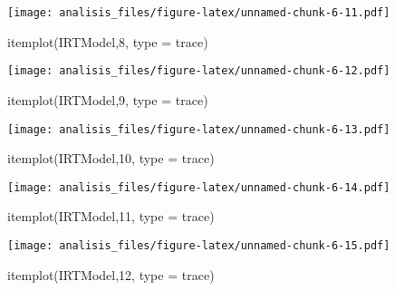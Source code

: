 \documentclass[
]{article}
\newenvironment{Shaded}{\begin{snugshade}}{\end{snugshade}}
\newcommand{\AttributeTok}[1]{\textcolor[rgb]{0.77,0.63,0.00}{#1}}
\newcommand{\DecValTok}[1]{\textcolor[rgb]{0.00,0.00,0.81}{#1}}
\newcommand{\FunctionTok}[1]{\textcolor[rgb]{0.00,0.00,0.00}{#1}}
\newcommand{\NormalTok}[1]{#1}
\newcommand{\StringTok}[1]{\textcolor[rgb]{0.31,0.60,0.02}{#1}}
\begin{document}
\texttt{[image: analisis\_files/figure-latex/unnamed-chunk-6-11.pdf]}

\begin{Shaded}
\begin{Highlighting}[]
\FunctionTok{itemplot}\NormalTok{(IRTModel,}\DecValTok{8}\NormalTok{, }\AttributeTok{type =} \StringTok{\textquotesingle{}trace\textquotesingle{}}\NormalTok{)}
\end{Highlighting}
\end{Shaded}

\texttt{[image: analisis\_files/figure-latex/unnamed-chunk-6-12.pdf]}

\begin{Shaded}
\begin{Highlighting}[]
\FunctionTok{itemplot}\NormalTok{(IRTModel,}\DecValTok{9}\NormalTok{, }\AttributeTok{type =} \StringTok{\textquotesingle{}trace\textquotesingle{}}\NormalTok{)}
\end{Highlighting}
\end{Shaded}

\texttt{[image: analisis\_files/figure-latex/unnamed-chunk-6-13.pdf]}

\begin{Shaded}
\begin{Highlighting}[]
\FunctionTok{itemplot}\NormalTok{(IRTModel,}\DecValTok{10}\NormalTok{, }\AttributeTok{type =} \StringTok{\textquotesingle{}trace\textquotesingle{}}\NormalTok{)}
\end{Highlighting}
\end{Shaded}

\texttt{[image: analisis\_files/figure-latex/unnamed-chunk-6-14.pdf]}

\begin{Shaded}
\begin{Highlighting}[]
\FunctionTok{itemplot}\NormalTok{(IRTModel,}\DecValTok{11}\NormalTok{, }\AttributeTok{type =} \StringTok{\textquotesingle{}trace\textquotesingle{}}\NormalTok{)}
\end{Highlighting}
\end{Shaded}

\texttt{[image: analisis\_files/figure-latex/unnamed-chunk-6-15.pdf]}

\begin{Shaded}
\begin{Highlighting}[]
\FunctionTok{itemplot}\NormalTok{(IRTModel,}\DecValTok{12}\NormalTok{, }\AttributeTok{type =} \StringTok{\textquotesingle{}trace\textquotesingle{}}\NormalTok{)}
\end{Highlighting}
\end{Shaded}
\end{document}
